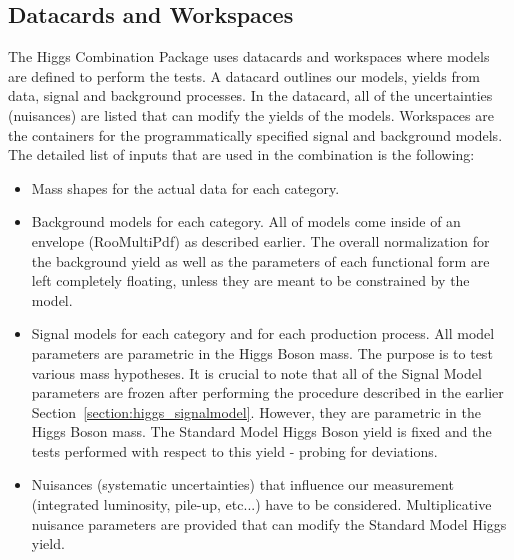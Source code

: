 \subsection{Datacards and Workspaces}
The Higgs Combination Package uses datacards and workspaces where models
are defined to perform the tests. A datacard outlines our models, yields
from data, signal and background processes. In the datacard, all
of the uncertainties (nuisances) are listed that can modify the yields of the models.
Workspaces are the containers for the programmatically specified signal and
background models. The detailed list of inputs that are used in the combination
 is the following:
\begin{itemize}
    \item Mass shapes for the actual data for each category.
    \item Background models for each category. All of models come inside of an envelope (RooMultiPdf) as described earlier. The overall normalization for the background yield as well as the parameters of each functional form are left completely floating, unless they are meant to be constrained by the model.
    \item Signal models for each category and for each production process. All model parameters are parametric in the Higgs Boson mass. The purpose is to test various mass hypotheses. It is crucial to note that all of the Signal Model parameters are frozen after performing the procedure described in the earlier Section~\ref{section:higgs_signalmodel}. However, they are parametric in the Higgs Boson mass. The Standard Model Higgs Boson yield is fixed and the tests performed with respect to this yield - probing for deviations.
    \item Nuisances (systematic uncertainties) that influence our measurement (integrated luminosity, pile-up, etc...) have to be considered. Multiplicative nuisance parameters are provided that can modify the Standard Model Higgs yield.
\end{itemize}

